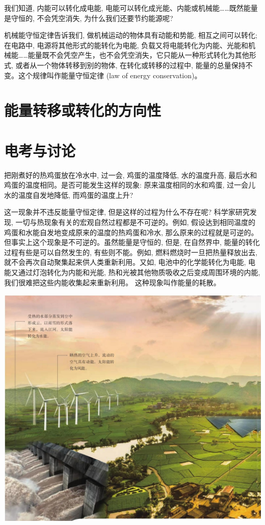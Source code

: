 \documentclass[10pt]{article}
\begin{document}
我们知道, 内能可以转化成电能, 电能可以转化成光能、内能或机械能……既然能量是守恒的, 不会凭空消失, 为什么我们还要节约能源呢?

机械能守恒定律告诉我们, 做机械运动的物体具有动能和势能, 相互之间可以转化; 在电路中, 电源将其他形式的能转化为电能, 负载又将电能转化为内能、光能和机械能……能量既不会凭空产生，也不会凭空消失，它只能从一种形式转化为其他形式, 或者从一个物体转移到别的物体, 在转化或转移的过程中, 能量的总量保持不变。这个规律叫作能量守恒定律 (law of energy conservation)。

\section*{能量转移或转化的方向性}

\section*{电考与讨论}

把刚煮好的热鸡蛋放在冷水中, 过一会, 鸡蛋的温度降低, 水的温度升高, 最后水和鸡蛋的温度相同。是否可能发生这样的现象: 原来温度相同的水和鸡蛋, 过一会儿水的温度自发地降低, 而鸡蛋的温度上升?

这一现象并不违反能量守恒定律, 但是这样的过程为什么不存在呢? 科学家研究发现, 一切与热现象有关的宏观自然过程都是不可逆的。例如, 假设达到相同温度的鸡蛋和水能自发地变成原来的温度的热鸡蛋和冷水, 那么原来的过程就是可逆的。但事实上这个现象是不可逆的。虽然能量是守恒的, 但是, 在自然界中, 能量的转化过程有些是可以自然发生的, 有些则不能。例如, 燃料燃烧时一旦把热量释放出去, 就不会再次自动聚集起来供人类重新利用。又如, 电池中的化学能转化为电能, 电能又通过灯泡转化为内能和光能, 热和光被其他物质吸收之后变成周围环境的内能, 我们很难把这些内能收集起来重新利用。 这种现象叫作能量的耗散。

\begin{center}
\includegraphics[max width=1.0\textwidth]{images/01911d5f-8e38-70c0-b5b8-2b399bd115b6_99_910729.jpg}
\end{center}
\end{document}
